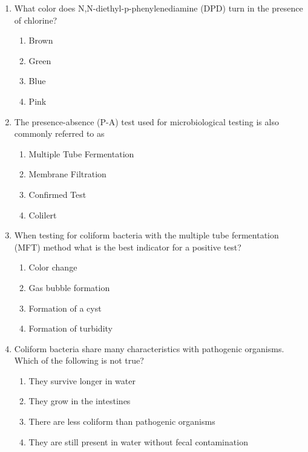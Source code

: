 \documentclass{article}
\begin{document}
\begin{enumerate}[1.]
\item What color does N,N-diethyl-p-phenylenediamine (DPD) turn in the presence of
chlorine?
\begin{enumerate}
\item Brown
\item Green
\item Blue
\item Pink
\end{enumerate}

\item  The presence-absence (P-A) test used for microbiological testing is also commonly referred to as\\
\begin{enumerate}
\item Multiple Tube Fermentation\\
\item Membrane Filtration\\
\item Confirmed Test\\
\item Colilert
\end{enumerate}

\item  When testing for coliform bacteria with the multiple tube fermentation (MFT) method what is the best indicator for a positive test?\\
\begin{enumerate}
\item Color change\\
\item Gas bubble formation\\
\item Formation of a cyst\\
\item Formation of turbidity
\end{enumerate}

\item  Coliform bacteria share many characteristics with pathogenic organisms. Which of the following is not true?\\
\begin{enumerate}
\item They survive longer in water\\
\item They grow in the intestines\\
\item There are less coliform than pathogenic organisms\\
\item They are still present in water without fecal contamination
\end{enumerate}


\end{enumerate}
\end{document}
